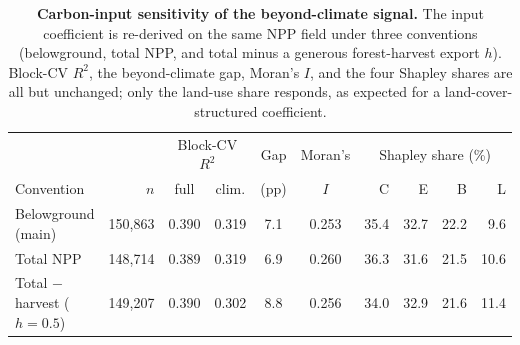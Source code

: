 \documentclass[12pt, a4paper]{article}
\begin{document}
\begin{table}[h!]
\centering\small
\caption{\textbf{Carbon-input sensitivity of the beyond-climate signal.} The input
coefficient is re-derived on the same NPP field under three conventions (belowground,
total NPP, and total minus a generous forest-harvest export $h$). Block-CV $R^2$, the
beyond-climate gap, Moran's $I$, and the four Shapley shares are all but unchanged;
only the land-use share responds, as expected for a land-cover-structured
coefficient.}
\label{edtab:input}
\begin{tabular}{lrccccrrrr}
\toprule
 & & \multicolumn{2}{c}{Block-CV $R^2$} & Gap & Moran's & \multicolumn{4}{c}{Shapley share (\%)} \\
\cmidrule(lr){3-4}\cmidrule(lr){7-10}
Convention & $n$ & full & clim. & (pp) & $I$ & C & E & B & L \\
\midrule
Belowground (main) & 150,863 & 0.390 & 0.319 & 7.1 & 0.253 & 35.4 & 32.7 & 22.2 & 9.6 \\
Total NPP & 148,714 & 0.389 & 0.319 & 6.9 & 0.260 & 36.3 & 31.6 & 21.5 & 10.6 \\
Total $-$ harvest ($h{=}0.5$) & 149,207 & 0.390 & 0.302 & 8.8 & 0.256 & 34.0 & 32.9 & 21.6 & 11.4 \\
\bottomrule
\end{tabular}
\end{table}
\end{document}
